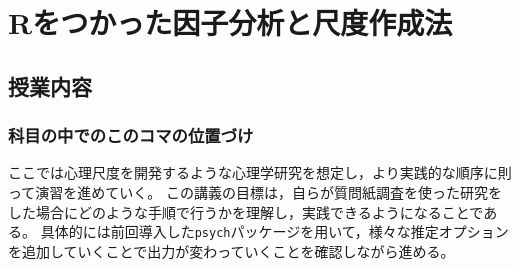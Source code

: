 \section{Rをつかった因子分析と尺度作成法}
\subsection{授業内容}
\subsubsection{科目の中でのこのコマの位置づけ}
ここでは心理尺度を開発するような心理学研究を想定し，より実践的な順序に則って演習を進めていく。
この講義の目標は，自らが質問紙調査を使った研究をした場合にどのような手順で行うかを理解し，実践できるようになることである。
具体的には前回導入した\texttt{psych}パッケージを用いて，様々な推定オプションを追加していくことで出力が変わっていくことを確認しながら進める。

